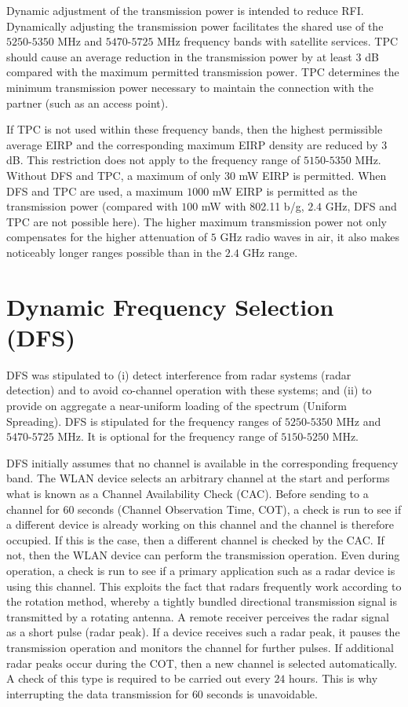 Dynamic adjustment of the transmission power is intended to reduce RFI. Dynamically adjusting the transmission power facilitates the shared use of the $5250$-$5350$ MHz and $5470$-$5725$ MHz frequency bands with satellite services. TPC should cause an average reduction in the transmission power by at least $3$ dB compared with the maximum permitted transmission power. TPC determines the minimum transmission power necessary to maintain the connection with the partner (such as an access point).

If TPC is not used within these frequency bands, then the highest permissible average EIRP and the corresponding maximum EIRP density are reduced by $3$ dB. This restriction does not apply to the frequency range of $5150$-$5350$ MHz. Without DFS and TPC, a maximum of only $30$ mW EIRP is permitted. When DFS and TPC are used, a maximum $1000$ mW EIRP is permitted as the transmission power (compared with $100$ mW with 802.11 b/g, $2.4$ GHz, DFS and TPC are not possible here). The higher maximum transmission power not only compensates for the higher attenuation of $5$ GHz radio waves in air, it also makes noticeably longer ranges possible than in the $2.4$ GHz range. 


\section{Dynamic Frequency Selection (DFS)}

DFS was stipulated to (i) detect interference from radar systems (radar detection) and to avoid co-channel operation with these systems; and (ii) to provide on aggregate a near-uniform loading of the spectrum (Uniform Spreading). DFS is stipulated for the frequency ranges of $5250$-$5350$ MHz and $5470$-$5725$ MHz. It is optional for the frequency range of $5150$-$5250$ MHz.

DFS initially assumes that no channel is available in the corresponding frequency band. The WLAN device selects an arbitrary channel at the start and performs what is known as a Channel Availability Check (CAC). Before sending to a channel for $60$ seconds (Channel Observation Time, COT), a check is run to see if a different device is already working on this channel and the channel is therefore occupied. If this is the case, then a different channel is checked by the CAC. If not, then the WLAN device can perform the transmission operation. Even during operation, a check is run to see if a primary application such as a radar device is using this channel. This exploits the fact that radars frequently work according to the rotation method, whereby a tightly bundled directional transmission signal is transmitted by a rotating antenna. A remote receiver perceives the radar signal as a short pulse (radar peak). If a device receives such a radar peak, it pauses the transmission operation and monitors the channel for further pulses. If additional radar peaks occur during the COT, then a new channel is selected automatically. A check of this type is required to be carried out every $24$ hours. This is why interrupting the data transmission for $60$ seconds is unavoidable. 


